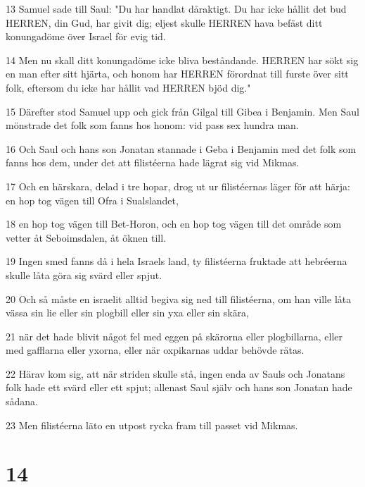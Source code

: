 \par 13 Samuel sade till Saul: "Du har handlat dåraktigt. Du har icke hållit det bud HERREN, din Gud, har givit dig; eljest skulle HERREN hava befäst ditt konungadöme över Israel för evig tid.
\par 14 Men nu skall ditt konungadöme icke bliva beståndande. HERREN har sökt sig en man efter sitt hjärta, och honom har HERREN förordnat till furste över sitt folk, eftersom du icke har hållit vad HERREN bjöd dig."
\par 15 Därefter stod Samuel upp och gick från Gilgal till Gibea i Benjamin. Men Saul mönstrade det folk som fanns hos honom: vid pass sex hundra man.
\par 16 Och Saul och hans son Jonatan stannade i Geba i Benjamin med det folk som fanns hos dem, under det att filistéerna hade lägrat sig vid Mikmas.
\par 17 Och en härskara, delad i tre hopar, drog ut ur filistéernas läger för att härja: en hop tog vägen till Ofra i Sualslandet,
\par 18 en hop tog vägen till Bet-Horon, och en hop tog vägen till det område som vetter åt Seboimsdalen, åt öknen till.
\par 19 Ingen smed fanns då i hela Israels land, ty filistéerna fruktade att hebréerna skulle låta göra sig svärd eller spjut.
\par 20 Och så måste en israelit alltid begiva sig ned till filistéerna, om han ville låta vässa sin lie eller sin plogbill eller sin yxa eller sin skära,
\par 21 när det hade blivit något fel med eggen på skärorna eller plogbillarna, eller med gafflarna eller yxorna, eller när oxpikarnas uddar behövde rätas.
\par 22 Härav kom sig, att när striden skulle stå, ingen enda av Sauls och Jonatans folk hade ett svärd eller ett spjut; allenast Saul själv och hans son Jonatan hade sådana.
\par 23 Men filistéerna läto en utpost rycka fram till passet vid Mikmas.

\chapter{14}

